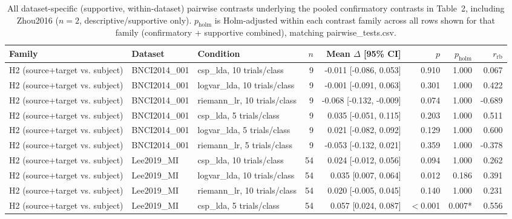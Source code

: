 \begin{table}[t]
\centering
\tiny
\begin{threeparttable}
\caption{All dataset-specific (supportive, within-dataset) pairwise contrasts underlying the pooled confirmatory contrasts in Table~2, including Zhou2016 ($n=2$, descriptive/supportive only). $p_\mathrm{holm}$ is Holm-adjusted within each contrast family across all rows shown for that family (confirmatory + supportive combined), matching pairwise\_tests.csv.}
\label{tab:dataset_specific_contrasts}
\begin{tabularx}{\textwidth}{@{} l l X r r r r r @{}}
\toprule
Family & Dataset & Condition & $n$ & Mean $\Delta$ [95\% CI] & $p$ & $p_\mathrm{holm}$ & $r_\mathrm{rb}$ \\
\midrule
H2 (source+target vs. subject) & BNCI2014\_001 & csp\_lda, 10 trials/class & 9 & -0.011 [-0.086, 0.053] & 0.910 & 1.000 & 0.067 \\
H2 (source+target vs. subject) & BNCI2014\_001 & logvar\_lda, 10 trials/class & 9 & -0.001 [-0.091, 0.063] & 0.301 & 1.000 & 0.422 \\
H2 (source+target vs. subject) & BNCI2014\_001 & riemann\_lr, 10 trials/class & 9 & -0.068 [-0.132, -0.009] & 0.074 & 1.000 & -0.689 \\
H2 (source+target vs. subject) & BNCI2014\_001 & csp\_lda, 5 trials/class & 9 & 0.035 [-0.051, 0.115] & 0.203 & 1.000 & 0.511 \\
H2 (source+target vs. subject) & BNCI2014\_001 & logvar\_lda, 5 trials/class & 9 & 0.021 [-0.082, 0.092] & 0.129 & 1.000 & 0.600 \\
H2 (source+target vs. subject) & BNCI2014\_001 & riemann\_lr, 5 trials/class & 9 & -0.053 [-0.132, 0.021] & 0.359 & 1.000 & -0.378 \\
H2 (source+target vs. subject) & Lee2019\_MI & csp\_lda, 10 trials/class & 54 & 0.024 [-0.012, 0.056] & 0.094 & 1.000 & 0.262 \\
H2 (source+target vs. subject) & Lee2019\_MI & logvar\_lda, 10 trials/class & 54 & 0.035 [0.007, 0.064] & 0.012 & 0.186 & 0.391 \\
H2 (source+target vs. subject) & Lee2019\_MI & riemann\_lr, 10 trials/class & 54 & 0.020 [-0.005, 0.045] & 0.140 & 1.000 & 0.231 \\
H2 (source+target vs. subject) & Lee2019\_MI & csp\_lda, 5 trials/class & 54 & 0.057 [0.024, 0.087] & $<$0.001 & 0.007* & 0.556 \\

\end{tabularx}
\end{threeparttable}
\end{table}
